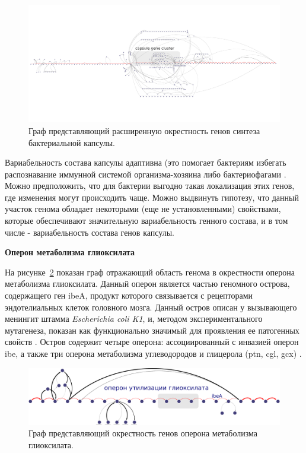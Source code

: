 \begin{figure}[!ht] 
  \center
    \includegraphics[width=\textwidth]{Dissertation/images/subgraphs/capsular_subgraph.pdf}
  \caption{Граф представляющий расширенную окрестность генов синтеза бактериальной капсулы. }
  \label{img:capsule_sub_large} 
\end{figure}

Вариабельность состава капсулы адаптивна (это помогает бактериям избегать распознавание иммунной системой организма-хозяина либо бактериофагами \cite{cress2014masquerading, lukavcova2008role}. Можно предположить, что для бактерии выгодно такая локализация этих генов, где изменения могут происходить чаще. Можно выдвинуть гипотезу, что данный участок генома обладает некоторыми (еще не установленными) свойствами, которые обеспечивают значительную вариабельность генного состава, и в том числе - вариабельность состава генов капсулы.

\textbf{Оперон метаболизма глиоксилата}

На рисунке~\ref{img:glioxilate} показан граф отражающий область генома в окрестности оперона метаболизма глиоксилата. Данный оперон является частью геномного острова, содержащего ген ibeA, продукт которого связывается с рецепторами эндотелиальных клеток головного мозга. Данный остров описан у вызывающего менингит штамма \textit{Escherichia coli K1}, и, методом экспериментального мутагенеза, показан как функционально значимый для проявления ее патогенных свойств \cite{huang2001novel}. Остров содержит четыре оперона: ассоциированный с инвазией оперон ibe, а также три оперона метаболизма углеводородов и глицерола (ptn, cgl, gcx) \cite{rakitina2017genome}. 

\begin{figure}[!ht] 
  \center
    \includegraphics[width=\textwidth]{Dissertation/images/subgraphs/glyoxilate_metabolism_operon_crop.png}
  \caption{Граф представляющий окрестность генов оперона метаболизма глиоксилата. }
  \label{img:glioxilate} 
\end{figure}

